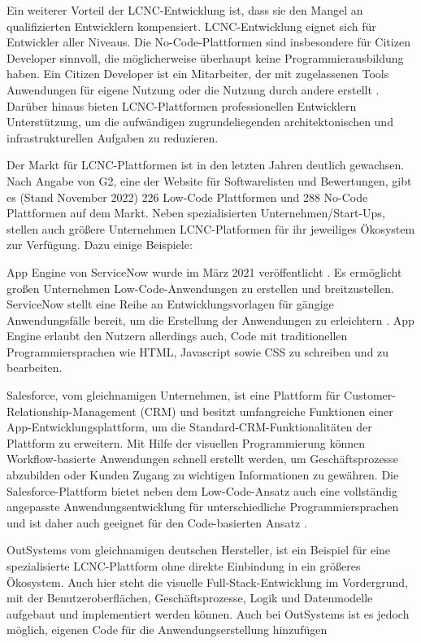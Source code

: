 Ein weiterer Vorteil der LCNC-Entwicklung ist, dass sie den Mangel an qualifizierten Entwicklern kompensiert. LCNC-Entwicklung eignet sich für Entwickler aller Niveaus. Die No-Code-Plattformen sind insbesondere für Citizen Developer sinnvoll, die möglicherweise überhaupt keine Programmierausbildung haben. Ein Citizen Developer ist ein Mitarbeiter, der mit zugelassenen Tools Anwendungen für eigene Nutzung oder die Nutzung durch andere erstellt \cite{lcnc:citidev}. Darüber hinaus bieten LCNC-Plattformen professionellen Entwicklern Unterstützung, um die aufwändigen zugrundeliegenden architektonischen und infrastrukturellen Aufgaben zu reduzieren.

Der Markt für LCNC-Plattformen ist in den letzten Jahren deutlich gewachsen. Nach Angabe von G2, eine der Website für Softwarelisten und Bewertungen, gibt es (Stand November 2022) 226 Low-Code Plattformen \cite{lcnc:llcdpa} und 288 No-Code Plattformen \cite{lcnc:lncdpa} auf dem Markt. Neben spezialisierten Unternehmen/Start-Ups, stellen auch größere Unternehmen LCNC-Platformen für ihr jeweiliges Ökosystem zur Verfügung. Dazu einige Beispiele:

App Engine von ServiceNow wurde im März 2021 veröffentlicht \cite{lcnc:aesrn}. Es ermöglicht großen Unternehmen Low-Code-Anwendungen zu erstellen und breitzustellen. ServiceNow stellt eine Reihe an Entwicklungsvorlagen für gängige Anwendungsfälle bereit, um die Erstellung der Anwendungen zu erleichtern \cite{lcnc:snflc}. App Engine erlaubt den Nutzern allerdings auch, Code mit traditionellen Programmiersprachen wie HTML, Javascript sowie CSS zu schreiben und zu bearbeiten.

Salesforce, vom gleichnamigen Unternehmen, ist eine Plattform für Customer-Relationship-Management (CRM) und besitzt umfangreiche Funktionen einer App-Entwicklungsplattform, um die Standard-CRM-Funktionalitäten der Plattform zu erweitern. Mit Hilfe der visuellen Programmierung können Workflow-basierte Anwendungen schnell erstellt werden, um Geschäftsprozesse abzubilden oder Kunden Zugang zu wichtigen Informationen zu gewähren. Die Salesforce-Plattform bietet neben dem Low-Code-Ansatz auch eine vollständig angepasste Anwendungsentwicklung für unterschiedliche Programmiersprachen und ist daher auch geeignet für den Code-basierten Ansatz \cite{lcnc:sfpr}.

OutSystems vom gleichnamigen deutschen Hersteller, ist ein Beispiel für eine spezialisierte LCNC-Plattform ohne direkte Einbindung in ein größeres Ökosystem. Auch hier steht die visuelle Full-Stack-Entwicklung im Vordergrund, mit der Benutzeroberflächen, Geschäftsprozesse, Logik und Datenmodelle aufgebaut und implementiert werden können. Auch bei OutSystems ist es jedoch möglich, eigenen Code für die Anwendungserstellung hinzufügen

